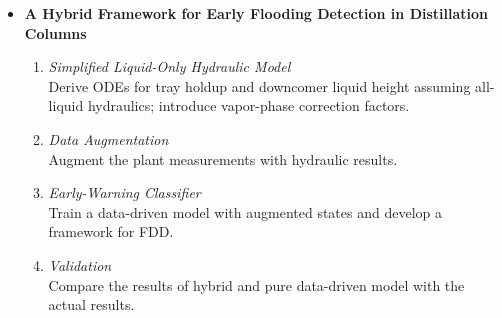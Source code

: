 \begin{itemize}
\begin{enumerate}
            \item \textit{Comparative Study}\\
                  Evaluate nominal MPC, adaptive MPC (re-identified model), and RL-tuned MPC under nominal conditions and disturbances.  
        \end{enumerate}
    \item \textbf{A Hybrid Framework for Early Flooding Detection in Distillation Columns}
        \begin{enumerate}
            \item \textit{Simplified Liquid-Only Hydraulic Model}\\
                  Derive ODEs for tray holdup and downcomer liquid height assuming all-liquid hydraulics; introduce vapor-phase correction factors.  
            \item \textit{Data Augmentation}\\
                  Augment the plant measurements with hydraulic results.  
            \item \textit{Early-Warning Classifier}\\
                  Train a data-driven model with augmented states and develop a framework for FDD.  
            \item \textit{Validation}\\
                  Compare the results of hybrid and pure data-driven model with the actual results.  
        \end{enumerate}
\end{itemize}

\CurrentStatus



